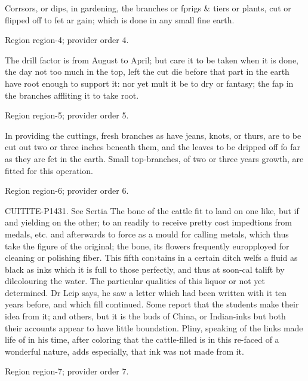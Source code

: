 \documentclass[11pt]{article}
\begin{document}
Corrsors, or dips, in gardening, the branches or fprigs \& tiers or plants, cut or flipped off to fet ar gain; which is done in any small fine earth.
\par

{\scriptsize\color{gray} Region region-4; provider order 4.\par}
\medskip

The drill factor is from August to April; but care it to be taken when it is done, the day not too much in the top, left the cut die before that part in the earth have root enough to support it: nor yet mult it be to dry or fantasy; the fap in the branches affliting it to take root.
\par

{\scriptsize\color{gray} Region region-5; provider order 5.\par}
\medskip

In providing the cuttings, fresh branches as have jeans, knots, or thurs, are to be cut out two or three inches beneath them, and the leaves to be dripped off fo far as they are fet in the earth. Small top-branches, of two or three years growth, are fitted for this operation.
\par

{\scriptsize\color{gray} Region region-6; provider order 6.\par}
\medskip

CUITITE-P1431. See Sertia The bone of the cattle fit to land on one like, but if and yielding on the other; to an readily to receive pretty cost impedtions from medals, etc. and afterwards to force as a mould for calling metals, which thus take the figure of the original; the bone, its flowers frequently europployed for cleaning or polishing fiber. This fifth con›tains in a certain ditch welfs a fluid as black as inks which it is full to those perfectly, and thus at soon-cal talift by dilcolouring the water. The particular qualities of this liquor or not yet determined. Dr Leip says, he saw a letter which had been written with it ten years before, and which fill continued. Some report that the students make their idea from it; and others, but it is the buds of China, or Indian-inks but both their accounts appear to have little boundstion. Pliny, speaking of the links made life of in his time, after coloring that the cattle-filled is in this re-faced of a wonderful nature, adds especially, that ink was not made from it.
\par

{\scriptsize\color{gray} Region region-7; provider order 7.\par}
\medskip
\end{document}
